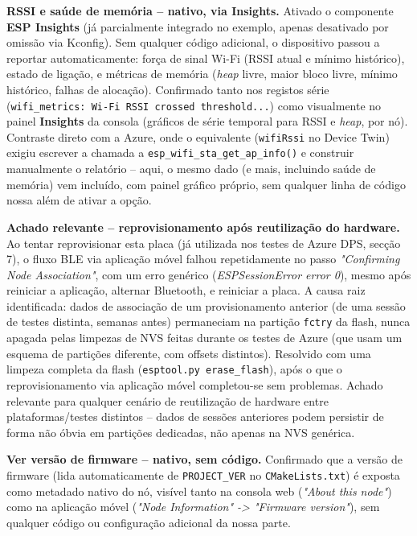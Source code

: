 \documentclass[a4paper,12pt]{article}
\begin{document}
\textbf{RSSI e saúde de memória -- nativo, via Insights.} Ativado o componente \textbf{ESP Insights} (já parcialmente integrado no exemplo, apenas desativado por omissão via Kconfig). Sem qualquer código adicional, o dispositivo passou a reportar automaticamente: força de sinal Wi-Fi (RSSI atual e mínimo histórico), estado de ligação, e métricas de memória (\textit{heap} livre, maior bloco livre, mínimo histórico, falhas de alocação). Confirmado tanto nos registos série (\texttt{wifi\_metrics: Wi-Fi RSSI crossed threshold...}) como visualmente no painel \textbf{Insights} da consola (gráficos de série temporal para RSSI e \textit{heap}, por nó). Contraste direto com a Azure, onde o equivalente (\texttt{wifiRssi} no Device Twin) exigiu escrever a chamada a \texttt{esp\_wifi\_sta\_get\_ap\_info()} e construir manualmente o relatório -- aqui, o mesmo dado (e mais, incluindo saúde de memória) vem incluído, com painel gráfico próprio, sem qualquer linha de código nossa além de ativar a opção.

\textbf{Achado relevante -- reprovisionamento após reutilização do hardware.} Ao tentar reprovisionar esta placa (já utilizada nos testes de Azure DPS, secção 7), o fluxo BLE via aplicação móvel falhou repetidamente no passo \textit{"Confirming Node Association"}, com um erro genérico (\textit{ESPSessionError error 0}), mesmo após reiniciar a aplicação, alternar Bluetooth, e reiniciar a placa. A causa raiz identificada: dados de associação de um provisionamento anterior (de uma sessão de testes distinta, semanas antes) permaneciam na partição \texttt{fctry} da flash, nunca apagada pelas limpezas de NVS feitas durante os testes de Azure (que usam um esquema de partições diferente, com offsets distintos). Resolvido com uma limpeza completa da flash (\texttt{esptool.py erase\_flash}), após o que o reprovisionamento via aplicação móvel completou-se sem problemas. Achado relevante para qualquer cenário de reutilização de hardware entre plataformas/testes distintos -- dados de sessões anteriores podem persistir de forma não óbvia em partições dedicadas, não apenas na NVS genérica.

\textbf{Ver versão de firmware -- nativo, sem código.} Confirmado que a versão de firmware (lida automaticamente de \texttt{PROJECT\_VER} no \texttt{CMakeLists.txt}) é exposta como metadado nativo do nó, visível tanto na consola web (\textit{"About this node"}) como na aplicação móvel (\textit{"Node Information" -> "Firmware version"}), sem qualquer código ou configuração adicional da nossa parte.
\end{document}
